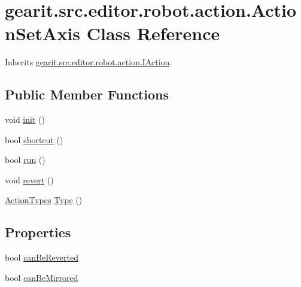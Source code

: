 \hypertarget{classgearit_1_1src_1_1editor_1_1robot_1_1action_1_1_action_set_axis}{\section{gearit.\+src.\+editor.\+robot.\+action.\+Action\+Set\+Axis Class Reference}
\label{classgearit_1_1src_1_1editor_1_1robot_1_1action_1_1_action_set_axis}
}


Inherits \hyperlink{interfacegearit_1_1src_1_1editor_1_1robot_1_1action_1_1_i_action}{gearit.\+src.\+editor.\+robot.\+action.\+I\+Action}.

\subsection*{Public Member Functions}
\begin{DoxyCompactItemize}
\item 
void \hyperlink{classgearit_1_1src_1_1editor_1_1robot_1_1action_1_1_action_set_axis_a1625dc15a9a5f39af000e3ea7d534392}{init} ()
\item 
bool \hyperlink{classgearit_1_1src_1_1editor_1_1robot_1_1action_1_1_action_set_axis_a399ceb75c43fd1744a2e226c0348ea7e}{shortcut} ()
\item 
bool \hyperlink{classgearit_1_1src_1_1editor_1_1robot_1_1action_1_1_action_set_axis_a882d2b43ff7ca6446bdc57dfd247a9f5}{run} ()
\item 
void \hyperlink{classgearit_1_1src_1_1editor_1_1robot_1_1action_1_1_action_set_axis_a90af00cd46a106bd9d834b674135b511}{revert} ()
\item 
\hyperlink{namespacegearit_1_1src_1_1editor_1_1robot_1_1action_a4be0fd46e3952d6135136b20e7b3fc5e}{Action\+Types} \hyperlink{classgearit_1_1src_1_1editor_1_1robot_1_1action_1_1_action_set_axis_a8dda418c21b4a81939b631e45647112a}{Type} ()
\end{DoxyCompactItemize}
\subsection*{Properties}
\begin{DoxyCompactItemize}
\item 
bool \hyperlink{classgearit_1_1src_1_1editor_1_1robot_1_1action_1_1_action_set_axis_ae9fb63888ef94a5e03f0cd92336b64f5}{can\+Be\+Reverted}
\item 
bool \hyperlink{classgearit_1_1src_1_1editor_1_1robot_1_1action_1_1_action_set_axis_a4fd26447a0ebefbe8098d241df37bffb}{can\+Be\+Mirrored}
\end{DoxyCompactItemize}


